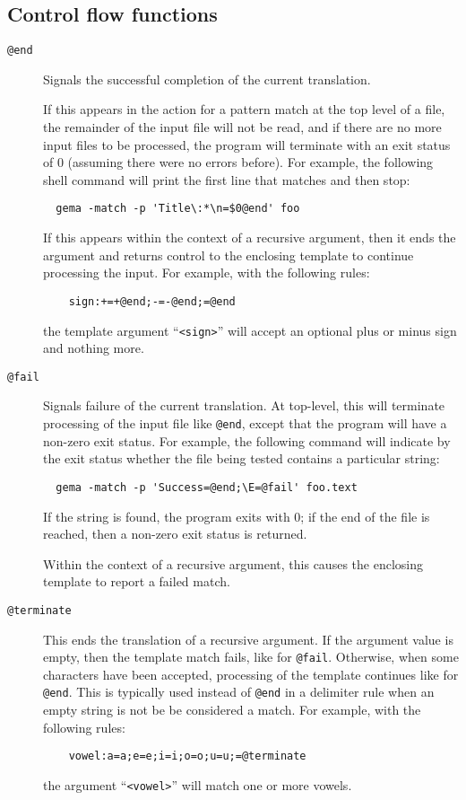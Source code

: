 \subsection{Control flow functions}
\begin{description}
\item[{\tt @end\ttlb\ttrb}]
Signals the successful completion of the current translation.

If this appears in the action for a pattern match at the top level of a
file, the remainder of the input file will not be read, and if there are
no more input files to be processed, the program will terminate with
an exit status of 0 (assuming there were no errors before).
For example, the following shell command will print the first line that
matches and then stop:
\begin{verbatim}
  gema -match -p 'Title\:*\n=$0@end' foo
\end{verbatim}

If this appears within the context of a recursive argument, then it ends
the argument and returns control to the enclosing template to continue
processing the input.
For example, with the following rules:
\begin{verbatim}
    sign:+=+@end;-=-@end;=@end
\end{verbatim}
the template argument ``\verb/<sign>/'' will accept an optional plus or
minus sign and nothing more.

\item[{\tt @fail\ttlb\ttrb}]
Signals failure of the current translation.
At top-level, this will terminate processing of the input file like
\verb/@end/, except that the program will have a non-zero exit status.
For example, the following command will indicate by the exit status
whether the file being tested contains a particular string:
\begin{verbatim}
  gema -match -p 'Success=@end;\E=@fail' foo.text
\end{verbatim}
If the string is found, the program exits with 0; if the end of the file
is reached, then a non-zero exit status is returned.

Within the context of a recursive argument, this causes the enclosing
template to report a failed match.

\item[{\tt @terminate\ttlb\ttrb}]
This ends the translation of a recursive argument.  If the argument
value is empty, then the template match fails, like for \verb/@fail/.
Otherwise, when some characters have been accepted, processing of the
template continues like for \verb/@end/.
This is typically used instead of \verb/@end/ in a delimiter rule when
an empty string is not be be considered a match.
For example, with the following rules:
\begin{verbatim}
    vowel:a=a;e=e;i=i;o=o;u=u;=@terminate
\end{verbatim}
the argument ``\verb/<vowel>/'' will match one or more vowels.


\end{description}
